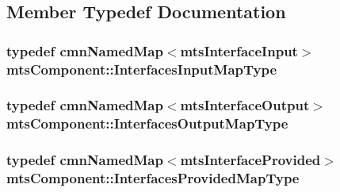 \subsection{Member Typedef Documentation}
\hypertarget{classmts_component_adfb95e70effe37bd6e8a66388cc9c9ed}{
\subsubsection[{Interfaces\-Input\-Map\-Type}]{\setlength{\rightskip}{0pt plus 5cm}typedef {\bf cmn\-Named\-Map}$<${\bf mts\-Interface\-Input}$>$ {\bf mts\-Component\-::\-Interfaces\-Input\-Map\-Type}\hspace{0.3cm}{\ttfamily [protected]}}}\label{classmts_component_adfb95e70effe37bd6e8a66388cc9c9ed}
\hypertarget{classmts_component_afa3bfa3828ea8532dbbca641006e9589}{
\subsubsection[{Interfaces\-Output\-Map\-Type}]{\setlength{\rightskip}{0pt plus 5cm}typedef {\bf cmn\-Named\-Map}$<${\bf mts\-Interface\-Output}$>$ {\bf mts\-Component\-::\-Interfaces\-Output\-Map\-Type}\hspace{0.3cm}{\ttfamily [protected]}}}\label{classmts_component_afa3bfa3828ea8532dbbca641006e9589}
\hypertarget{classmts_component_a1d4117bf122737abe5f943a7ce057ff6}{
\subsubsection[{Interfaces\-Provided\-Map\-Type}]{\setlength{\rightskip}{0pt plus 5cm}typedef {\bf cmn\-Named\-Map}$<${\bf mts\-Interface\-Provided}$>$ {\bf mts\-Component\-::\-Interfaces\-Provided\-Map\-Type}\hspace{0.3cm}{\ttfamily [protected]}}}\label{classmts_component_a1d4117bf122737abe5f943a7ce057ff6}
